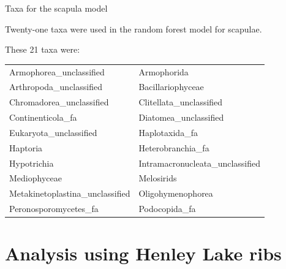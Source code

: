 \documentclass{beamer}
\begin{document}
\begin{frame}{Taxa for the scapula model}

  {\scriptsize
    
  \noindent Twenty-one taxa were used in the random forest model for
  scapulae.
  
  \vspace{0.1in}

  \noindent These 21 taxa were:
  
  \vspace{0.05in}

  \begin{tabular}{ll}
    Armophorea\_unclassified         & Armophorida\\                   
    Arthropoda\_unclassified         & Bacillariophyceae\\              
    Chromadorea\_unclassified        & Clitellata\_unclassified\\        
    Continenticola\_fa               & Diatomea\_unclassified\\         
    Eukaryota\_unclassified          & Haplotaxida\_fa\\         
    Haptoria                         & Heterobranchia\_fa\\              
    Hypotrichia                      & Intramacronucleata\_unclassified\\
    Mediophyceae                     & Melosirids\\                     
    Metakinetoplastina\_unclassified & Oligohymenophorea\\              
    Peronosporomycetes\_fa           & Podocopida\_fa\\             
  \end{tabular}
  }

\end{frame}



\section[Ribs]{Analysis using Henley Lake ribs}
\end{document}
